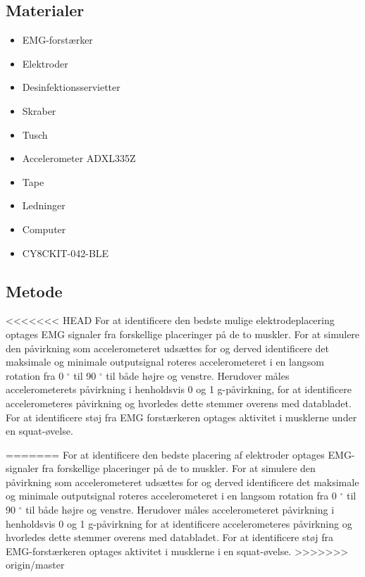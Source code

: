\subsection{Materialer} 
\begin{itemize}
\item EMG-forstærker
\item Elektroder
\item Desinfektionsservietter
\item Skraber
\item Tusch 

\item Accelerometer ADXL335Z
\item Tape
\item Ledninger

\item Computer
\item CY8CKIT-042-BLE
\end{itemize}

\subsection{Metode}

<<<<<<< HEAD
For at identificere den bedste mulige elektrodeplacering optages EMG signaler fra forskellige placeringer på de to muskler. 
For at simulere den påvirkning som accelerometeret udsættes for og derved identificere det maksimale og minimale outputsignal roteres accelerometeret i en langsom rotation fra 0 $^{\circ}$ til 90 $^{\circ}$ til både højre og venstre. Herudover måles accelerometerets påvirkning i henholdsvis 0 og 1 g-påvirkning, for at identificere accelerometeres påvirkning og hvorledes dette stemmer overens med databladet. 
For at identificere støj fra EMG forstærkeren optages aktivitet i musklerne under en squat-øvelse.
 
=======
For at identificere den bedste placering af elektroder optages EMG-signaler fra forskellige placeringer på de to muskler. 
For at simulere den påvirkning som accelerometeret udsættes for og derved identificere det maksimale og minimale outputsignal roteres accelerometeret i en langsom rotation fra 0 $^{\circ}$ til 90 $^{\circ}$  til både højre og venstre. Herudover måles accelerometeret påvirkning i henholdsvis 0 og 1 g-påvirkning for at identificere accelerometeres påvirkning og hvorledes dette stemmer overens med databladet. 
For at identificere støj fra EMG-forstærkeren optages aktivitet i musklerne i en squat-øvelse.
>>>>>>> origin/master

